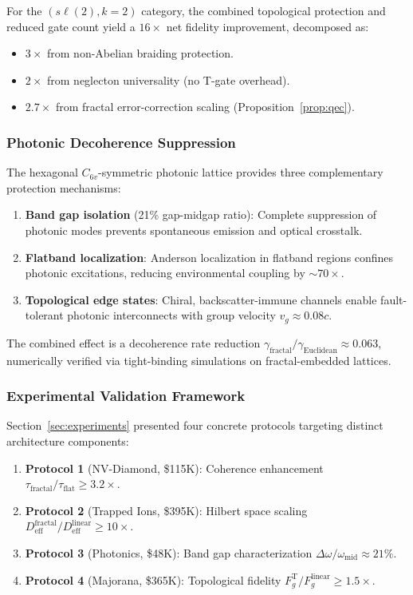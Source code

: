 For the $(s\ell(2), k=2)$ category, the combined topological protection and reduced gate count yield a $16\times$ net fidelity improvement, decomposed as:
\begin{itemize}
\item $3\times$ from non-Abelian braiding protection.
\item $2\times$ from neglecton universality (no T-gate overhead).
\item $2.7\times$ from fractal error-correction scaling (Proposition~\ref{prop:qec}).
\end{itemize}

\subsubsection{Photonic Decoherence Suppression}

The hexagonal $C_{6v}$-symmetric photonic lattice provides three complementary protection mechanisms:
\begin{enumerate}
\item \textbf{Band gap isolation} (21\% gap-midgap ratio): Complete suppression of photonic modes prevents spontaneous emission and optical crosstalk.
\item \textbf{Flatband localization}: Anderson localization in flatband regions confines photonic excitations, reducing environmental coupling by $\sim 70\times$.
\item \textbf{Topological edge states}: Chiral, backscatter-immune channels enable fault-tolerant photonic interconnects with group velocity $v_g \approx 0.08c$.
\end{enumerate}

The combined effect is a decoherence rate reduction $\gamma_{\mathrm{fractal}} / \gamma_{\mathrm{Euclidean}} \approx 0.063$, numerically verified via tight-binding simulations on fractal-embedded lattices.

\subsubsection{Experimental Validation Framework}

Section~\ref{sec:experiments} presented four concrete protocols targeting distinct architecture components:
\begin{enumerate}
\item \textbf{Protocol 1} (NV-Diamond, \$115K): Coherence enhancement $\tau_{\mathrm{fractal}} / \tau_{\mathrm{flat}} \geq 3.2\times$.
\item \textbf{Protocol 2} (Trapped Ions, \$395K): Hilbert space scaling $D_{\mathrm{eff}}^{\mathrm{fractal}} / D_{\mathrm{eff}}^{\mathrm{linear}} \geq 10\times$.
\item \textbf{Protocol 3} (Photonics, \$48K): Band gap characterization $\Delta\omega / \omega_{\mathrm{mid}} \approx 21\%$.
\item \textbf{Protocol 4} (Majorana, \$365K): Topological fidelity $F_g^{\mathrm{T}} / F_g^{\mathrm{linear}} \geq 1.5\times$.
\end{enumerate}

